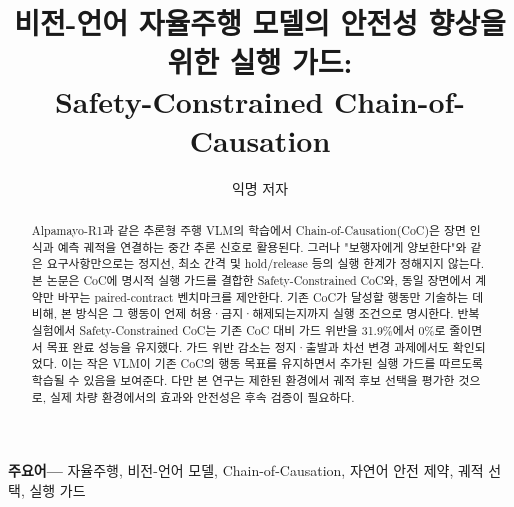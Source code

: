\ieeeclasstrue\documentclass[10pt,journal]{IEEEtran}
\title{비전-언어 자율주행 모델의 안전성 향상을 위한 실행 가드:\\Safety-Constrained Chain-of-Causation}
\author{익명 저자}
\date{}
\newenvironment{IEEEkeywords}{\par\small\noindent\textbf{주요어---}}{\par}
\begin{document}
\maketitle

\begin{abstract}
Alpamayo-R1과 같은 추론형 주행 VLM의 학습에서 Chain-of-Causation(CoC)은 장면 인식과 예측 궤적을 연결하는 중간 추론 신호로 활용된다. 그러나 "보행자에게 양보한다"와 같은 요구사항만으로는 정지선, 최소 간격 및 hold/release 등의 실행 한계가 정해지지 않는다. 본 논문은 CoC에 명시적 실행 가드를 결합한 Safety-Constrained CoC와, 동일 장면에서 계약만 바꾸는 paired-contract 벤치마크를 제안한다. 기존 CoC가 달성할 행동만 기술하는 데 비해, 본 방식은 그 행동이 언제 허용·금지·해제되는지까지 실행 조건으로 명시한다. 반복 실험에서 Safety-Constrained CoC는 기존 CoC 대비 가드 위반을 31.9\%에서 0\%로 줄이면서 목표 완료 성능을 유지했다. 가드 위반 감소는 정지·출발과 차선 변경 과제에서도 확인되었다. 이는 작은 VLM이 기존 CoC의 행동 목표를 유지하면서 추가된 실행 가드를 따르도록 학습될 수 있음을 보여준다. 다만 본 연구는 제한된 환경에서 궤적 후보 선택을 평가한 것으로, 실제 차량 환경에서의 효과와 안전성은 후속 검증이 필요하다.
\end{abstract}

\begin{IEEEkeywords}
자율주행, 비전-언어 모델, Chain-of-Causation, 자연어 안전 제약, 궤적 선택, 실행 가드
\end{IEEEkeywords}




\raggedbottom


\flushbottom



\ifieeeclass
  
\else
  
\fi
\begingroup
\small

\endgroup
\end{document}
